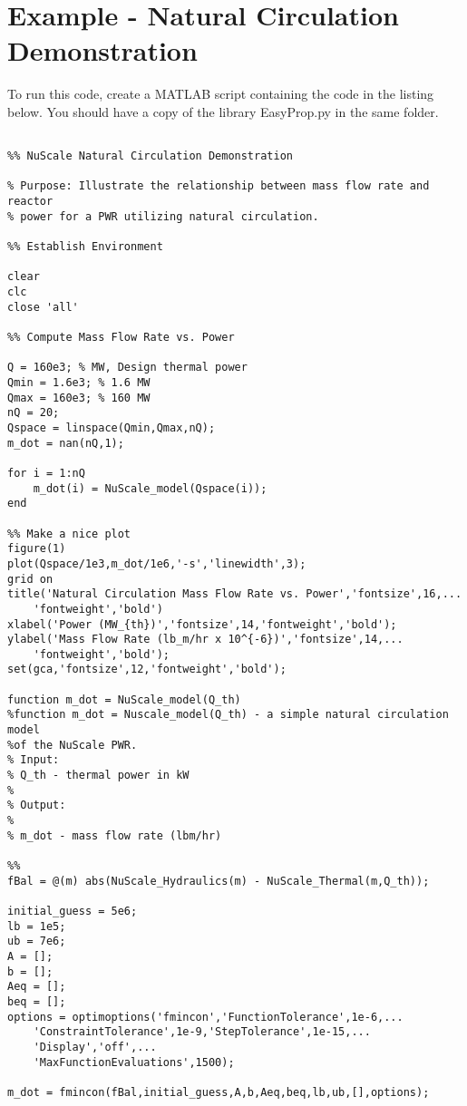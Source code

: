 \chapter{Example - Natural Circulation Demonstration}
\label{app:NC_ex}


To run this code, create a MATLAB script containing the code in the listing below.  You should have a copy of the library EasyProp.py in the same folder.

\begin{fullwidth}
\begin{lstlisting}

%% NuScale Natural Circulation Demonstration

% Purpose: Illustrate the relationship between mass flow rate and reactor
% power for a PWR utilizing natural circulation.

%% Establish Environment

clear
clc
close 'all'

%% Compute Mass Flow Rate vs. Power

Q = 160e3; % MW, Design thermal power
Qmin = 1.6e3; % 1.6 MW
Qmax = 160e3; % 160 MW
nQ = 20;
Qspace = linspace(Qmin,Qmax,nQ);
m_dot = nan(nQ,1);

for i = 1:nQ
    m_dot(i) = NuScale_model(Qspace(i));
end

%% Make a nice plot
figure(1)
plot(Qspace/1e3,m_dot/1e6,'-s','linewidth',3);
grid on
title('Natural Circulation Mass Flow Rate vs. Power','fontsize',16,...
    'fontweight','bold')
xlabel('Power (MW_{th})','fontsize',14,'fontweight','bold');
ylabel('Mass Flow Rate (lb_m/hr x 10^{-6})','fontsize',14,...
    'fontweight','bold');
set(gca,'fontsize',12,'fontweight','bold');

function m_dot = NuScale_model(Q_th)
%function m_dot = Nuscale_model(Q_th) - a simple natural circulation model
%of the NuScale PWR.  
% Input:
% Q_th - thermal power in kW
%
% Output:
% 
% m_dot - mass flow rate (lbm/hr)

%%
fBal = @(m) abs(NuScale_Hydraulics(m) - NuScale_Thermal(m,Q_th));

initial_guess = 5e6;
lb = 1e5;
ub = 7e6;
A = []; 
b = [];
Aeq = [];
beq = [];
options = optimoptions('fmincon','FunctionTolerance',1e-6,...
    'ConstraintTolerance',1e-9,'StepTolerance',1e-15,...
    'Display','off',...
    'MaxFunctionEvaluations',1500);

m_dot = fmincon(fBal,initial_guess,A,b,Aeq,beq,lb,ub,[],options);


\end{lstlisting}
\end{fullwidth}
